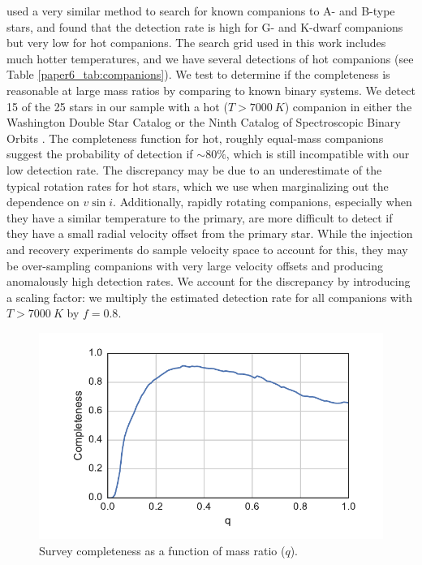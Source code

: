 \citet{Gullikson2016} used a very similar method to search for known companions to A- and B-type stars, and found that the detection rate is high for G- and K-dwarf companions but very low for hot companions. The search grid used in this work includes much hotter temperatures, and we have several detections of hot companions (see Table \ref{paper6_tab:companions}). We test to determine if the completeness is reasonable at large mass ratios by comparing to known binary systems. We detect 15 of the 25 stars in our sample with a hot ($T > 7000\ K$) companion in either the Washington Double Star Catalog \citep{WDS} or the Ninth Catalog of Spectroscopic Binary Orbits \citep{SB9}. The completeness function for hot, roughly equal-mass companions suggest the probability of detection if $\sim 80\%$, which is still incompatible with our low detection rate. The discrepancy may be due to an underestimate of the typical rotation rates for hot stars, which we use when marginalizing out the dependence on $v\sin{i}$. Additionally, rapidly rotating companions, especially when they have a similar temperature to the primary, are more difficult to detect if they have a small radial velocity offset from the primary star. While the injection and recovery experiments do sample velocity space to account for this, they may be over-sampling companions with very large velocity offsets and producing anomalously high detection rates. We account for the discrepancy by introducing a scaling factor: we multiply the estimated detection rate for all companions with $T > 7000\ K$ by $f=0.8$. 


\begin{figure}
\includegraphics[width=\columnwidth]{Figures/paper6_SurveyCompleteness.pdf}
\caption{Survey completeness as a function of mass ratio ($q$).}
\label{paper6_fig:completeness}
\end{figure}

